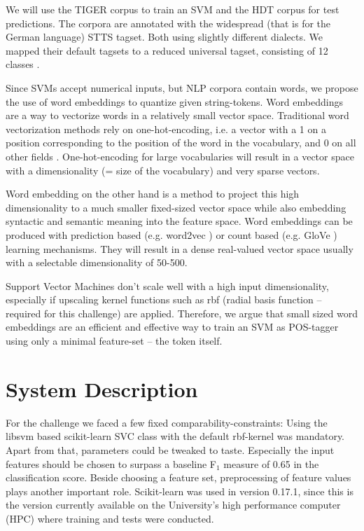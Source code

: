 \documentclass[11pt,a4paper]{article}
\begin{document}
We will use the TIGER corpus to train an SVM and the HDT corpus for test predictions. The corpora are annotated with the widespread (that is for the German language) STTS \cite{schiller1999} tagset. Both using slightly different dialects. We mapped their default tagsets to a reduced universal tagset, consisting of 12 classes \cite{petrov2011universal}.

Since SVMs accept numerical inputs, but NLP corpora contain words, we propose the use of word embeddings to quantize given string-tokens. Word embeddings are a way to vectorize words in a relatively small vector space. Traditional word vectorization methods rely on one-hot-encoding, i.e. a vector with a 1 on a position corresponding to the position of the word in the vocabulary, and 0 on all other fields \cite{hinton1984distributed}. One-hot-encoding for large vocabularies will result in a vector space with a dimensionality (= size of the vocabulary) and very sparse vectors.

Word embedding on the other hand is a method to project this high dimensionality to a much smaller fixed-sized vector space while also embedding syntactic and semantic meaning into the feature space. Word embeddings can be produced with prediction based (e.g. word2vec \cite{mikolov2013efficient}) or count based (e.g. GloVe \cite{pennington2014glove}) learning mechanisms. They will result in a dense real-valued vector space usually with a selectable dimensionality of 50-500.

Support Vector Machines don't scale well with a high input dimensionality, especially if upscaling kernel functions such as rbf (radial basis function -- required for this challenge) are applied. Therefore, we argue that small sized word embeddings are an efficient and effective way to train an SVM as POS-tagger using only a minimal feature-set -- the token itself.



\section{System Description}
For the challenge we faced a few fixed comparability-constraints: Using the libsvm based scikit-learn \cite{scikit-learn} SVC class with the default rbf-kernel was mandatory. Apart from that, parameters could be tweaked to taste. Especially the input features should be chosen to surpass a baseline F$_1$ measure of 0.65 in the classification score. Beside choosing a feature set, preprocessing of feature values plays another important role. Scikit-learn was used in version 0.17.1, since this is the version currently available on the University's high performance computer (HPC) where training and tests were conducted.
\end{document}
